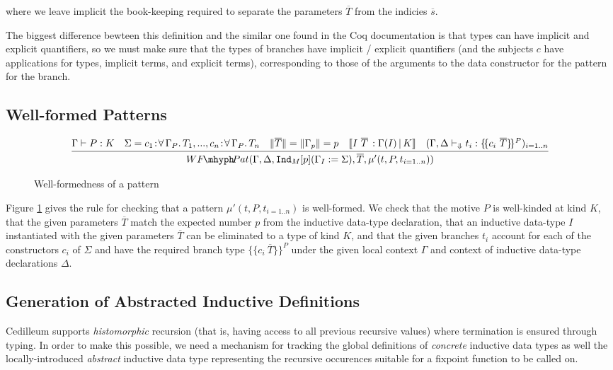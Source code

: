\documentclass{article}
\newcommand{\ann}[2]{#1\! : \! #2}
\newcommand{\absu}[3]{{#1}\, #2.\, #3}
\newcommand{\indast}[4]{\texttt{Ind}_{#1} [#2] (#3 := #4)}
\newcommand{\lenc}[1]{\|#1\|}
\newcommand{\vars}[1]{{\overline{#1}}}
\newcommand{\decchk}{\vdash_{\Downarrow}}
\newcommand{\wfpat}[4]{WF\!\mhyph\!Pat(#1,#2,#3,#4)}
\newcommand{\llbrace}{\{\!\{}
\newcommand{\rrbrace}{\}\!\}}
\begin{document}
\noindent where we leave implicit the book-keeping required to separate the
parameters $\vars{T}$ from the indicies $\vars{s}$.

The biggest difference bewteen this definition and the similar one found in the
Coq documentation is that types can have implicit and explicit quantifiers, so
we must make sure that the types of branches have implicit / explicit
quantifiers (and the subjects $c$ have applications for types, implicit terms, and
explicit terms), corresponding to those of the arguments to the data constructor
for the pattern for the branch.

\subsection{Well-formed Patterns}
\label{ssec:pattern-wf-pat}

\begin{figure}[h]
  \caption{Well-formedness of a pattern}
  \label{fig:wf-pattern}
  \[
    \infer
    { \wfpat{\Gamma,\Delta}{\indast{M}{p}{\Gamma_I}{\Sigma}}{\vars{T}}{\mu'(t,P,t_{i=1..n})}
    }
    { \Gamma \vdash P : K
      \quad \Sigma = \ann{c_1}{\absu{\forall}{\Gamma_P}{T_1}}, ..., \ann{c_n}{\absu{\forall}{\Gamma_P}{T_n}}
      \quad \lenc{\vars{T}} = \lenc{\Gamma_p} = p
      \quad \llbracket I\ \vars{T}\, : \Gamma(I)\, |\, K \rrbracket
      \quad (\Gamma,\Delta \decchk t_i : \llbrace c_i\ \vars{T} \rrbrace^P)_{i=1..n}
    }
  \]
\end{figure}

Figure \ref{fig:wf-pattern} gives the rule for checking that a pattern
$\mu'(t,P,t_{i=1..n})$ is well-formed. We check that the motive $P$ is
well-kinded at kind $K$, that the given parameters $\vars{T}$ match the expected
number $p$ from the inductive data-type declaration, that an inductive data-type
$I$ instantiated with the given parameters $\vars{T}$ can be eliminated to a
type of kind $K$, and that the given branches $t_i$ account for each of the
constructors $c_i$ of $\Sigma$ and have the required branch type $\llbrace c_i\
\vars{T} \rrbrace^P$ under the given local context $\Gamma$ and context of
inductive data-type declarations $\Delta$.

\subsection{Generation of Abstracted Inductive Definitions}
\label{ssec:patern-abstracted-gen}

Cedilleum supports \textit{histomorphic} recursion (that is, having access to
all previous recursive values) where termination is ensured
through typing. In order to make this possible, we need a mechanism for tracking
the global definitions of \textit{concrete} inductive data types as well the
locally-introduced \textit{abstract} inductive data type representing the
recursive occurences suitable for a fixpoint function to be called on.
\end{document}
